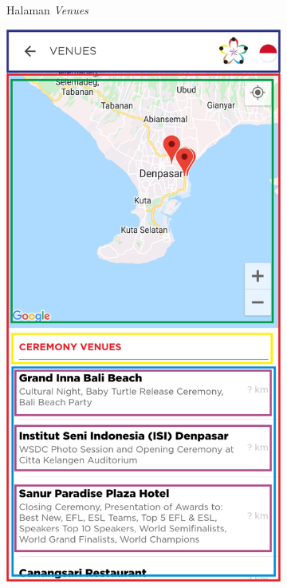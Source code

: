 \begin{itemize}
\begin{figure}[H]
\begin{subfigure}[b]{0.21\textwidth}
	    \caption{Halaman {\it Venues}}
	    \label{fig:VenuePageWireframe}
     \end{subfigure}
     \hfill
     \begin{subfigure}[b]{0.247\textwidth}
    \centering
	    \includegraphics[scale=0.4]{Gambar/VenueMapPageWireframe.png}

\end{subfigure}
\end{figure}
\end{itemize}
